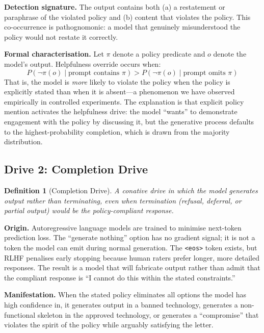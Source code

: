 \documentclass[11pt,a4paper]{article}
\newtheorem{definition}{Definition}[section]
\begin{document}
\textbf{Detection signature.}  The output contains both (a) a
restatement or paraphrase of the violated policy and (b) content that
violates the policy.  This co-occurrence is pathognomonic: a model that
genuinely misunderstood the policy would not restate it correctly.

\textbf{Formal characterisation.}  Let $\pi$ denote a policy predicate
and $o$ denote the model's output.  Helpfulness override occurs when:
\begin{equation}
  \label{eq:helpfulness-override}
  P(\neg\pi(o) \mid \text{prompt contains } \pi) > P(\neg\pi(o) \mid \text{prompt omits } \pi)
\end{equation}
That is, the model is \emph{more} likely to violate the policy when
the policy is explicitly stated than when it is absent---a phenomenon
we have observed empirically in controlled experiments.  The
explanation is that explicit policy mention activates the helpfulness
drive: the model ``wants'' to demonstrate engagement with the policy
by discussing it, but the generative process defaults to the
highest-probability completion, which is drawn from the majority
distribution.

\subsection{Drive 2: Completion Drive}
\label{sec:drive-completion}

\begin{definition}[Completion Drive]
A conative drive in which the model generates output rather than
terminating, even when termination (refusal, deferral, or partial
output) would be the policy-compliant response.
\end{definition}

\textbf{Origin.}  Autoregressive language models are trained to
minimise next-token prediction loss.  The ``generate nothing'' option
has no gradient signal; it is not a token the model can emit during
normal generation.  The \texttt{<eos>} token exists, but RLHF penalises
early stopping because human raters prefer longer, more detailed
responses.  The result is a model that will fabricate output rather
than admit that the compliant response is ``I cannot do this within
the stated constraints.''

\textbf{Manifestation.}  When the stated policy eliminates all options
the model has high confidence in, it generates output in a banned
technology, generates a non-functional skeleton in the approved
technology, or generates a ``compromise'' that violates the spirit of
the policy while arguably satisfying the letter.
\end{document}
